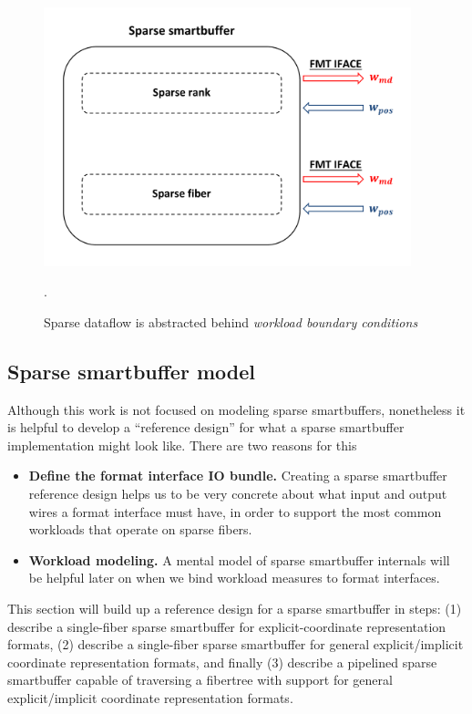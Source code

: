 \begin{figure}[ht]
    \centering
    \includegraphics[width=0.95\textwidth]{figures/sparse_sbuf_wkld_overview.pdf}
    \caption{Sparse dataflow is abstracted behind \textit{workload boundary conditions}}.
    \label{fig:sparse_sbuff_wkld_overview}
\end{figure}




\subsection{Sparse smartbuffer model}

Although this work is not focused on modeling sparse smartbuffers, nonetheless it is helpful to develop a ``reference design'' for what a sparse smartbuffer implementation might look like. There are two reasons for this

\begin{itemize}
    \item \textbf{Define the format interface IO bundle.} Creating a sparse smartbuffer reference design helps us to be very concrete about what input and output wires a format interface must have, in order to support the most common workloads that operate on sparse fibers.
    \item \textbf{Workload modeling.} A mental model of sparse smartbuffer internals will be helpful later on when we bind workload measures to format interfaces.
\end{itemize}

This section will build up a reference design for a sparse smartbuffer in steps: (1) describe a single-fiber sparse smartbuffer for explicit-coordinate representation formats, (2) describe a single-fiber sparse smartbuffer for general explicit/implicit coordinate representation formats, and finally (3) describe a pipelined sparse smartbuffer capable of traversing a fibertree with support for general explicit/implicit coordinate representation formats.

